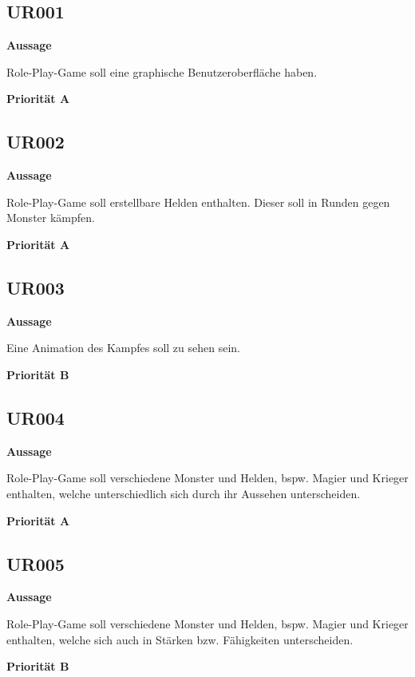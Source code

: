     \subsection{UR001}
        \hspace*{10mm} \textbf{Aussage} 
            \begin{addmargin}{20mm} 
                Role-Play-Game soll eine graphische Benutzeroberfläche haben.
            \end{addmargin}
        \hspace*{10mm} \textbf{Priorität A}
    \subsection{UR002}
        \hspace*{10mm} \textbf{Aussage} 
            \begin{addmargin}{20mm} 
                Role-Play-Game soll erstellbare Helden enthalten. Dieser soll in Runden gegen Monster kämpfen.
            \end{addmargin}
        \hspace*{10mm} \textbf{Priorität A}
    \subsection{UR003}
        \hspace*{10mm} \textbf{Aussage} 
            \begin{addmargin}{20mm}
                Eine Animation des Kampfes soll zu sehen sein.
            \end{addmargin}
        \hspace*{10mm} \textbf{Priorität B}
    \subsection{UR004}
        \hspace*{10mm} \textbf{Aussage} 
            \begin{addmargin}{20mm}
                Role-Play-Game soll verschiedene Monster und Helden, bspw. Magier und Krieger enthalten, welche unterschiedlich sich durch ihr Aussehen unterscheiden.
            \end{addmargin}
        \hspace*{10mm} \textbf{Priorität A}
    \subsection{UR005}
        \hspace*{10mm} \textbf{Aussage} 
            \begin{addmargin}{20mm}
                Role-Play-Game soll verschiedene Monster und Helden, bspw. Magier und Krieger enthalten, welche sich auch in Stärken bzw. Fähigkeiten unterscheiden.
            \end{addmargin}
        \hspace*{10mm} \textbf{Priorität B}

